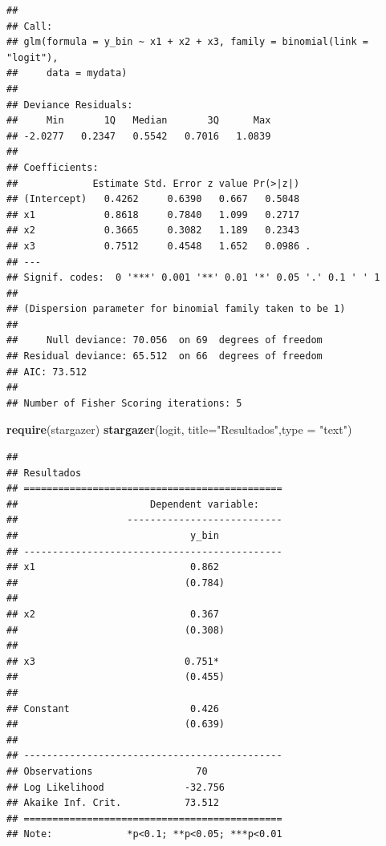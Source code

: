 \documentclass[12pt,brazil,]{book}
\newenvironment{Shaded}{\begin{snugshade}}{\end{snugshade}}
\newcommand{\DataTypeTok}[1]{\textcolor[rgb]{0.13,0.29,0.53}{#1}}
\newcommand{\KeywordTok}[1]{\textcolor[rgb]{0.13,0.29,0.53}{\textbf{#1}}}
\newcommand{\NormalTok}[1]{#1}
\newcommand{\StringTok}[1]{\textcolor[rgb]{0.31,0.60,0.02}{#1}}
\begin{document}
\begin{verbatim}
## 
## Call:
## glm(formula = y_bin ~ x1 + x2 + x3, family = binomial(link = "logit"), 
##     data = mydata)
## 
## Deviance Residuals: 
##     Min       1Q   Median       3Q      Max  
## -2.0277   0.2347   0.5542   0.7016   1.0839  
## 
## Coefficients:
##             Estimate Std. Error z value Pr(>|z|)  
## (Intercept)   0.4262     0.6390   0.667   0.5048  
## x1            0.8618     0.7840   1.099   0.2717  
## x2            0.3665     0.3082   1.189   0.2343  
## x3            0.7512     0.4548   1.652   0.0986 .
## ---
## Signif. codes:  0 '***' 0.001 '**' 0.01 '*' 0.05 '.' 0.1 ' ' 1
## 
## (Dispersion parameter for binomial family taken to be 1)
## 
##     Null deviance: 70.056  on 69  degrees of freedom
## Residual deviance: 65.512  on 66  degrees of freedom
## AIC: 73.512
## 
## Number of Fisher Scoring iterations: 5
\end{verbatim}

\begin{Shaded}
\begin{Highlighting}[]
\KeywordTok{require}\NormalTok{(stargazer)}
\KeywordTok{stargazer}\NormalTok{(logit, }\DataTypeTok{title=}\StringTok{"Resultados"}\NormalTok{,}\DataTypeTok{type =} \StringTok{"text"}\NormalTok{)}
\end{Highlighting}
\end{Shaded}

\begin{verbatim}
## 
## Resultados
## =============================================
##                       Dependent variable:    
##                   ---------------------------
##                              y_bin           
## ---------------------------------------------
## x1                           0.862           
##                             (0.784)          
##                                              
## x2                           0.367           
##                             (0.308)          
##                                              
## x3                          0.751*           
##                             (0.455)          
##                                              
## Constant                     0.426           
##                             (0.639)          
##                                              
## ---------------------------------------------
## Observations                  70             
## Log Likelihood              -32.756          
## Akaike Inf. Crit.           73.512           
## =============================================
## Note:             *p<0.1; **p<0.05; ***p<0.01
\end{verbatim}
\end{document}
